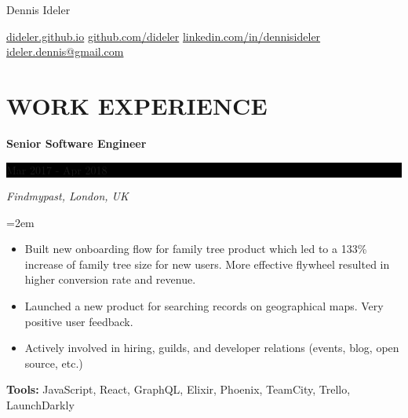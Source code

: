 \documentclass[paper=a4,fontsize=11pt]{scrartcl} %
\newlength{\spacebox}
\newcommand{\sepspace}{\vspace*{1em}}     %
\newcommand{\FullName}[1]{
    \Huge \usefont{OT1}{phv}{b}{n} \hfill #1
    \par \normalsize \normalfont}
\newcommand{\Slogan}[1]{
    \large \usefont{OT1}{phv}{m}{n}\hfill \textit{#1}
    \par \normalsize \normalfont}
\newcommand{\NewPart}[1]{\section*{\uppercase{#1}}}
\newcommand{\PersonalEntry}[2]{
    \noindent\hangindent=2em\hangafter=0  %
    \parbox{\spacebox}{                   %
    \textit{#1}}                          %
    \hspace{1.5em} #2 \par}               %
\newcommand{\EducationEntry}[4]{
    \noindent \textbf{#1} \hfill        %
    \colorbox{Black}{
      \parbox{8.5em}{
      \hfill\color{White}#2}} \par      %
    \noindent \textit{#3} \par          %
    \noindent\hangindent=2em\hangafter=0 \small #4 %
    \normalsize \par}
\newcommand{\WorkEntry}[4]{             %
    \noindent \textbf{#1} \hfill        %
    \colorbox{Black}{%
      \parbox{9em}{%
      \hfill\color{White}#2}} \par      %
        \noindent \textit{#3} \par      %
    \noindent\hangindent=2em\hangafter=0 \small #4 %
    \normalsize \par}
\begin{document}
\FullName{Dennis Ideler}
\bigskip
{\small
  \href{https://dideler.github.io}{dideler.github.io} \quad
  \href{https://github.com/dideler}{github.com/dideler} \quad
  \href{https://linkedin.com/in/dennisideler}{linkedin.com/in/dennisideler} \quad
  \href{mailto:ideler.dennis@gmail.com}{ideler.dennis@gmail.com}
}

\sepspace

%


\NewPart{Work experience}{}


\WorkEntry{Senior Software Engineer}{Mar 2017 - Apr 2018}
{Findmypast, London, UK}
{
  \begin{itemize} \itemsep -1pt
    \item Built new onboarding flow for family tree product which led to a 133\% increase of family tree size for new users.
    More effective flywheel resulted in higher conversion rate and revenue.
    \item Launched a new product for searching records on geographical maps. Very positive user feedback.
    \item Actively involved in hiring, guilds, and developer relations (events, blog, open source, etc.)
  \end{itemize}
  \textbf{Tools:} JavaScript, React, GraphQL, Elixir, Phoenix, TeamCity, Trello, LaunchDarkly
}
\sepspace
\end{document}

